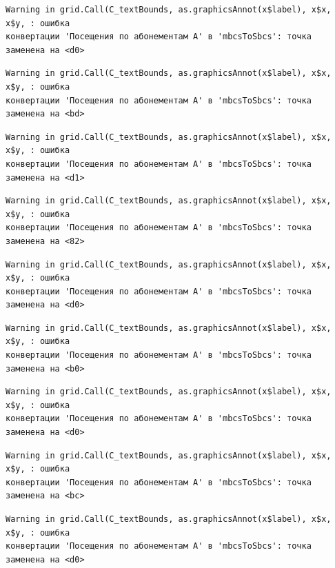 \documentclass[
  letterpaper,
  DIV=11,
  numbers=noendperiod]{scrreprt}
\begin{document}
\begin{verbatim}
Warning in grid.Call(C_textBounds, as.graphicsAnnot(x$label), x$x, x$y, : ошибка
конвертации 'Посещения по абонементам А' в 'mbcsToSbcs': точка заменена на <d0>
\end{verbatim}

\begin{verbatim}
Warning in grid.Call(C_textBounds, as.graphicsAnnot(x$label), x$x, x$y, : ошибка
конвертации 'Посещения по абонементам А' в 'mbcsToSbcs': точка заменена на <bd>
\end{verbatim}

\begin{verbatim}
Warning in grid.Call(C_textBounds, as.graphicsAnnot(x$label), x$x, x$y, : ошибка
конвертации 'Посещения по абонементам А' в 'mbcsToSbcs': точка заменена на <d1>
\end{verbatim}

\begin{verbatim}
Warning in grid.Call(C_textBounds, as.graphicsAnnot(x$label), x$x, x$y, : ошибка
конвертации 'Посещения по абонементам А' в 'mbcsToSbcs': точка заменена на <82>
\end{verbatim}

\begin{verbatim}
Warning in grid.Call(C_textBounds, as.graphicsAnnot(x$label), x$x, x$y, : ошибка
конвертации 'Посещения по абонементам А' в 'mbcsToSbcs': точка заменена на <d0>
\end{verbatim}

\begin{verbatim}
Warning in grid.Call(C_textBounds, as.graphicsAnnot(x$label), x$x, x$y, : ошибка
конвертации 'Посещения по абонементам А' в 'mbcsToSbcs': точка заменена на <b0>
\end{verbatim}

\begin{verbatim}
Warning in grid.Call(C_textBounds, as.graphicsAnnot(x$label), x$x, x$y, : ошибка
конвертации 'Посещения по абонементам А' в 'mbcsToSbcs': точка заменена на <d0>
\end{verbatim}

\begin{verbatim}
Warning in grid.Call(C_textBounds, as.graphicsAnnot(x$label), x$x, x$y, : ошибка
конвертации 'Посещения по абонементам А' в 'mbcsToSbcs': точка заменена на <bc>
\end{verbatim}

\begin{verbatim}
Warning in grid.Call(C_textBounds, as.graphicsAnnot(x$label), x$x, x$y, : ошибка
конвертации 'Посещения по абонементам А' в 'mbcsToSbcs': точка заменена на <d0>
\end{verbatim}
\end{document}
